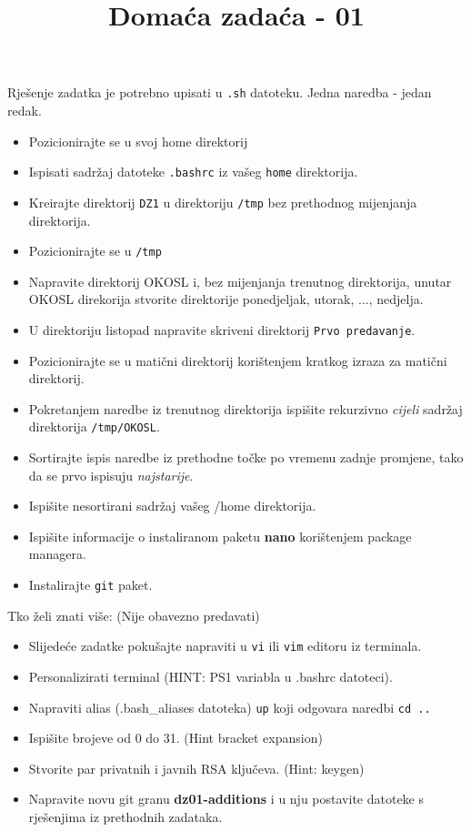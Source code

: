 \documentclass[12pt,a4paper]{article}
\newcommand{\shell}[1]{\texttt{#1}}
\begin{document}
  \title{Domaća zadaća - 01}
  \maketitle
  Rješenje zadatka je potrebno upisati u \shell{.sh} datoteku. Jedna naredba - jedan redak.
  \begin{itemize}
  	\item Pozicionirajte se u svoj home direktorij
    \item Ispisati sadržaj datoteke \shell{.bashrc} iz vašeg \shell{home} direktorija.
    \item Kreirajte direktorij \shell{DZ1} u direktoriju \shell{/tmp} bez prethodnog mijenjanja direktorija.
	\item Pozicionirajte se u \shell{/tmp}
    \item Napravite direktorij OKOSL i, bez mijenjanja trenutnog direktorija, unutar OKOSL direkorija stvorite direktorije ponedjeljak, utorak, ..., nedjelja.
    \item U direktoriju listopad napravite skriveni direktorij \shell{Prvo predavanje}.
    \item Pozicionirajte se u matični direktorij korištenjem kratkog izraza za matični direktorij.
    \item Pokretanjem naredbe iz trenutnog direktorija ispišite rekurzivno \textit{cijeli} sadržaj direktorija \shell{/tmp/OKOSL}.
    \item Sortirajte ispis naredbe iz prethodne točke po vremenu zadnje promjene, tako da se prvo ispisuju \textit{najstarije}.
    \item Ispišite nesortirani sadržaj vašeg /home direktorija.
    \item Ispišite informacije o instaliranom paketu \textbf{nano} korištenjem package managera.
    \item Instalirajte \shell{git} paket.
  \end{itemize}
  Tko želi znati više: (Nije obavezno predavati)
  \begin{itemize}
    \item Slijedeće zadatke pokušajte napraviti u \shell{vi} ili \shell{vim} editoru iz terminala.
    \item Personalizirati terminal (HINT: PS1 variabla u .bashrc datoteci).
    \item Napraviti alias (.bash\_aliases datoteka) \shell{up} koji odgovara naredbi \shell{cd ..}
    \item Ispišite brojeve od 0 do 31. (Hint bracket expansion)
    \item Stvorite par privatnih i javnih RSA ključeva. (Hint: keygen)
    \item Napravite novu git granu \textbf{dz01-additions} i u nju postavite datoteke s rješenjima iz prethodnih zadataka.
  \end{itemize}
\end{document}
